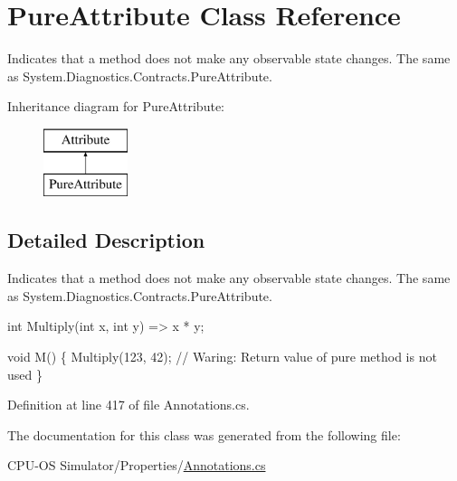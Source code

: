 \hypertarget{class_pure_attribute}{}\section{Pure\+Attribute Class Reference}
\label{class_pure_attribute}


Indicates that a method does not make any observable state changes. The same as {\ttfamily System.\+Diagnostics.\+Contracts.\+Pure\+Attribute}.  


Inheritance diagram for Pure\+Attribute\+:\begin{figure}[H]
\begin{center}
\leavevmode
\includegraphics[height=2.000000cm]{class_pure_attribute}
\end{center}
\end{figure}


\subsection{Detailed Description}
Indicates that a method does not make any observable state changes. The same as {\ttfamily System.\+Diagnostics.\+Contracts.\+Pure\+Attribute}. 


\begin{DoxyCode}
[Pure] \textcolor{keywordtype}{int} Multiply(\textcolor{keywordtype}{int} x, \textcolor{keywordtype}{int} y) => x * y;

\textcolor{keywordtype}{void} M() \{
  Multiply(123, 42); \textcolor{comment}{// Waring: Return value of pure method is not used}
\}
\end{DoxyCode}


Definition at line 417 of file Annotations.\+cs.



The documentation for this class was generated from the following file\+:\begin{DoxyCompactItemize}
\item 
C\+P\+U-\/\+O\+S Simulator/\+Properties/\hyperlink{_annotations_8cs}{Annotations.\+cs}\end{DoxyCompactItemize}
